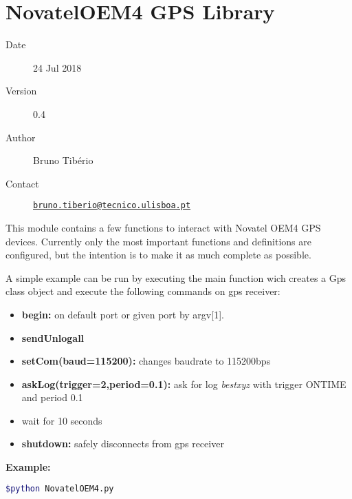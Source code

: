 
\chapter{NovatelOEM4 GPS Library}\label{welcome-to-novateloem4-gps-librarys-documentation}

\begin{description}
\item[Date]
24 Jul 2018
\item[Version]
0.4
\item[Author]
Bruno Tibério
\item[Contact]
\href{mailto:bruno.tiberio@tecnico.ulisboa.pt}{\nolinkurl{bruno.tiberio@tecnico.ulisboa.pt}}
\end{description}

This module contains a few functions to interact with Novatel OEM4 GPS
devices. Currently only the most important functions and definitions are
configured, but the intention is to make it as much complete as
possible.

A simple example can be run by executing the main function wich creates
a Gps class object and execute the following commands on gps receiver:

\begin{itemize}
\tightlist
\item
  \textbf{begin:} on default port or given port by argv{[}1{]}.
\item
  \textbf{sendUnlogall}
\item
  \textbf{setCom(baud=115200):} changes baudrate to 115200bps
\item
  \textbf{askLog(trigger=2,period=0.1):} ask for log \emph{bestxyz} with
  trigger {ONTIME} and period {0.1}
\item
  wait for 10 seconds
\item
  \textbf{shutdown:} safely disconnects from gps receiver
\end{itemize}

\textbf{Example:}

\begin{lstlisting}[language=bash,frame=none,backgroundcolor=\color{gray!15},numbers=none]
$python NovatelOEM4.py
\end{lstlisting}
